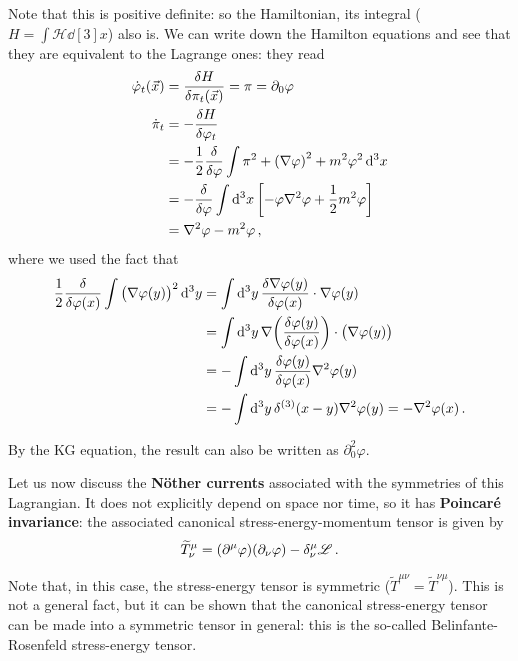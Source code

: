 \documentclass[main.tex]{subfiles}
\begin{document}
Note that this is positive definite: so the Hamiltonian, its integral (\(H = \int \mathscr{H} \dd[3]{x}\)) also is.
We can write down the Hamilton equations and see that they are equivalent to the Lagrange ones: they read 
%
\begin{subequations}
\begin{align}
\dot{\varphi}_{t} (\vec{x}) &= \fdv{H}{\pi_{t} (\vec{x})}
 = \pi = \partial_{0} \varphi   \\
\dot{\pi}_{t} &= - \fdv{H}{\varphi_{t}}  \\
&= - \frac{1}{2} \fdv{}{\varphi } \int \pi^2 + \qty(\nabla \varphi)^2 + m^2 \varphi^2 \dd[3]{x}  \\
&= - \fdv{}{\varphi } \int \dd[3]{x} \qty[- \varphi \nabla^2 \varphi + \frac{1}{2} m^2 \varphi ]  \\
&= \nabla^2\varphi  - m^2 \varphi 
\,,
\end{align}
\end{subequations}
%
where we used the fact that 
%
\begin{subequations}
\begin{align}
\frac{1}{2}\fdv{}{\varphi(x) } \int \qty(\nabla \varphi(y) )^2 \dd[3]{y} 
&= \int \dd[3]{y} \fdv{ \nabla \varphi (y) }{\varphi (x) } \cdot \nabla \varphi (y) \\
&= \int \dd[3]{y} \nabla \qty(\fdv{\varphi (y) }{\varphi( x) } ) \cdot\qty(\nabla \varphi (y) )  \\
&= - \int \dd[3]{y} \fdv{\varphi (y) }{\varphi(x) } \nabla^2 \varphi (y)   \\
&= - \int \dd[3]{y} \delta^{(3)} (x- y) \nabla^2 \varphi (y)
= - \nabla^2\varphi (x)
\,.
\end{align}
\end{subequations}

By the KG equation, the result can also be written as \(\partial_{0}^2 \varphi\).

Let us now discuss the \textbf{Nöther currents} associated with the symmetries of this Lagrangian. It does not explicitly depend on space nor time, so it has \textbf{Poincaré invariance}: the associated canonical stress-energy-momentum tensor is given by 
%
\begin{align}
\widetilde{T}^{\mu }_{\nu }
= \qty(\partial^{\mu } \varphi ) \qty(\partial_{\nu } \varphi ) - \delta^{\mu }_{\nu }\mathscr{L} 
\,.
\end{align}

Note that, in this case, the stress-energy tensor is symmetric (\(\widetilde{T}^{\mu \nu } = \widetilde{T}^{\nu \mu }\)). This is not a general fact, but it can be shown that the canonical stress-energy tensor can be made into a symmetric tensor in general: this is the so-called Belinfante-Rosenfeld stress-energy tensor. 
\end{document}
